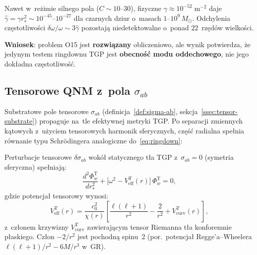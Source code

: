 \begin{remark}\label{rem:strong-detect}
Nawet w~re\.zimie silnego pola ($C \sim 10$--$30$),
fizyczne $\gamma \approx 10^{-52}\;\mathrm{m}^{-2}$ daje
$\hat\gamma = \gamma r_s^2 \sim 10^{-45}$--$10^{-27}$
dla czarnych dziur o~masach $1$--$10^9\,M_\odot$.
Odchylenia cz\k{e}stotliwo\'sci $\delta\omega/\omega \sim 3\hat\gamma$
pozostaj\k{a} niedetektowalne o~ponad $22$~rz\k{e}d\'ow
wielko\'sci.

\textbf{Wniosek}: problem O15 jest \textbf{rozwi\k{a}zany}
obliczeniowo, ale wynik potwierdza, \.ze jedynym testem
ringdownu TGP jest \textbf{obecno\'s\'c modu oddechowego},
nie jego dok\l{}adna cz\k{e}stotliwo\'s\'c.
\end{remark}

\subsection{Tensorowe QNM z~pola $\sigma_{ab}$}\label{ssec:tensor-qnm}

Substratowe pole tensorowe $\sigma_{ab}$
(definicja~\ref{def:sigma-ab}, sekcja~\ref{ssec:tensor-substrate})
propaguje na~tle efektywnej metryki TGP.
Po separacji zmiennych k\k{a}towych z~u\.zyciem
tensorowych harmonik sferycznych, cz\k{e}\'s\'c radialna
spe\l{}nia r\'ownanie typu Schr\"odingera analogiczne
do~\eqref{eq:ringdown}:

\begin{proposition}\label{prop:tensor-ringdown}
Perturbacje tensorowe $\delta\sigma_{ab}$ wok\'o\l{}
statycznego t\l{}a TGP z~$\sigma_{ab} = 0$ (symetria sferyczna)
spe\l{}niaj\k{a}:
\begin{equation}\label{eq:tensor-ringdown}
  \frac{d^2\Phi_w^{\mathrm{T}}}{dr_*^2}
  + \bigl[\omega^2 - V_{\mathrm{eff}}^{\mathrm{T}}(r)\bigr]
  \,\Phi_w^{\mathrm{T}} = 0,
\end{equation}
gdzie potencja\l{} tensorowy wynosi:
\begin{equation}\label{eq:V-eff-tensor}
  V_{\mathrm{eff}}^{\mathrm{T}}(r) = \frac{c_0^2}{\chi(r)}
  \left[
    \frac{\ell(\ell+1)}{r^2}
    - \frac{2}{r^2}
    + V_{\mathrm{curv}}^{\mathrm{T}}(r)
  \right],
\end{equation}
z~cz\l{}onem krzywizny $V_{\mathrm{curv}}^{\mathrm{T}}$
zawieraj\k{a}cym tensor Riemanna t\l{}a konforemnie
p\l{}askiego. Cz\l{}on $-2/r^2$ jest pochodn\k{a} spinu~2
(por.~potencja\l{} Regge'a--Wheelera $\ell(\ell+1)/r^2 - 6M/r^3$
w~GR).
\end{proposition}

